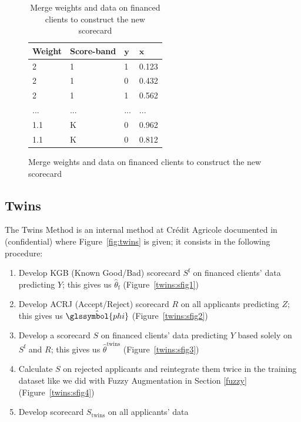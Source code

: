 \begin{table}
{\begin{multicols}{3}
\columnbreak

\begin{subfigure}[t]{0.31\textwidth}
\begin{center}
\begin{adjustbox}{max width=0.95\textwidth}

\begin{tabular}{l l l l}
\toprule
\textbf{Weight} & \textbf{Score-band} & \textbf{${\bm{y}}$} & \textbf{${\bm{x}}$}\\
\midrule
2 & 1 & 1 & 0.123 \\
2 & 1 & 0 & 0.432 \\
2 & 1 & 1 & 0.562 \\
... & ... & ... & ... \\
1.1 & K & 0 & 0.962 \\
1.1 & K & 0 & 0.812 \\
\bottomrule
\end{tabular}
\end{adjustbox}
\end{center}

\caption{Merge weights and data on financed clients to construct the new scorecard}
\label{augment:sfig3}
\end{subfigure}
\end{multicols}
}
\end{table}

\subsection{Twins} \label{Twins}

The Twins Method is an internal method at Crédit Agricole documented in~\cite{groupe} (confidential) where Figure~\ref{fig:twins} is given; it consists in the following procedure:
\begin{enumerate}
\item Develop KGB (Known Good/Bad) scorecard $S^{\text{f}}$ on financed clients' data predicting $Y$; this gives us $\hat{\theta}_{\text{f}}$ (Figure~\ref{twins:sfig1})
\item Develop ACRJ (Accept/Reject) scorecard $R$ on all applicants predicting $Z$; this gives us $\hat{\glssymbol{phi}}$ (Figure~\ref{twins:sfig2})
\item Develop a scorecard $S$ on financed clients' data predicting $Y$ based solely on $S^{\text{f}}$ and $R$; this gives us $\hat{\theta}^{\text{twins}}$ (Figure~\ref{twins:sfig3})
\item Calculate $S$ on rejected applicants and reintegrate them twice in the training dataset like we did with Fuzzy Augmentation in Section \ref{fuzzy} (Figure~\ref{twins:sfig4})
\item Develop scorecard $S_{\text{twins}}$ on all applicants' data
\end{enumerate}

